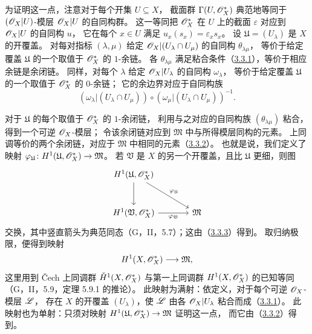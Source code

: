 为证明这一点，注意对于每个开集 $U\subseteq X$，
截面群 $\Gamma(U,\mathscr O_X^*)$ 典范地等同于 $(\mathscr O_X|U)$-模层 $\mathscr O_X|U$ 的自同构群。
这一等同把 $\mathscr O_X^*$ 在 $U$ 上的截面 $\varepsilon$ 对应到 $\mathscr O_X|U$ 的自同构 $u$，
它在每个 $x\in U$ 满足 $u_x(s_x)=\varepsilon_xs_x$。
设 $\mathfrak U=(U_\lambda)$ 是 $X$ 的开覆盖。
对每对指标 $(\lambda,\mu)$ 给定 $\mathscr O_X|(U_\lambda\cap U_\mu)$ 的自同构 $\theta_{\lambda\mu}$，
等价于给定覆盖 $\mathfrak U$ 的一个取值于 $\mathscr O_X^*$ 的 $1$-余链。
各 $\theta_{\lambda\mu}$ 满足粘合条件（\hyperlink{para:0:3.3.1}{3.3.1}），等价于相应余链是余闭链。
同样，对每个 $\lambda$ 给定 $\mathscr O_X|U_\lambda$ 的自同构 $\omega_\lambda$，
等价于给定覆盖 $\mathfrak U$ 的一个取值于 $\mathscr O_X^*$ 的 $0$-余链；
它的余边界对应于自同构族
\[
 (\omega_\lambda|(U_\lambda\cap U_\mu))
 \circ(\omega_\mu|(U_\lambda\cap U_\mu))^{-1}.
\]

对于 $\mathfrak U$ 的每个取值于 $\mathscr O_X^*$ 的 $1$-余闭链，
利用与之对应的自同构族 $(\theta_{\lambda\mu})$ 粘合，得到一个可逆 $\mathscr O_X$-模层；
令该余闭链对应到 $\mathfrak M$ 中与所得模层同构的元素。
上同调等价的两个余闭链，对应于 $\mathfrak M$ 中相同的元素（\hyperlink{para:0:3.3.2}{3.3.2}）。
也就是说，我们定义了映射
$\varphi_{\mathfrak U}\colon H^1(\mathfrak U,\mathscr O_X^*)\to\mathfrak M$。
若 $\mathfrak V$ 是 $X$ 的另一个开覆盖，且比 $\mathfrak U$ 更细，则图
\[
\begin{tikzcd}[column sep=large,row sep=large]
 H^1(\mathfrak U,\OO_X^*)\arrow[d]\arrow[dr,"\varphi_{\mathfrak U}"]&\\
 H^1(\mathfrak V,\OO_X^*)\arrow[r,"\varphi_{\mathfrak V}"']&\mathfrak M
\end{tikzcd}
\]
交换，其中竖直箭头为典范同态（G，II，5.7）；这由（\hyperlink{para:0:3.3.3}{3.3.3}）得到。
取归纳极限，便得到映射
\[
 H^1(X,\mathscr O_X^*)\longrightarrow\mathfrak M,
\]
这里用到 Čech 上同调群 $\check H^1(X,\mathscr O_X^*)$ 与第一上同调群
$H^1(X,\mathscr O_X^*)$ 的已知等同（G，II，5.9，定理 5.9.1 的推论）。
此映射为满射：依定义，对于每个可逆 $\mathscr O_X$-模层 $\mathscr L$，
存在 $X$ 的开覆盖 $(U_\lambda)$，使 $\mathscr L$ 由各 $\mathscr O_X|U_\lambda$ 粘合而成（\hyperlink{para:0:3.3.1}{3.3.1}）。
此映射也为单射：只须对映射 $H^1(\mathfrak U,\mathscr O_X^*)\to\mathfrak M$ 证明这一点，
而它由（\hyperlink{para:0:3.3.2}{3.3.2}）得到。

